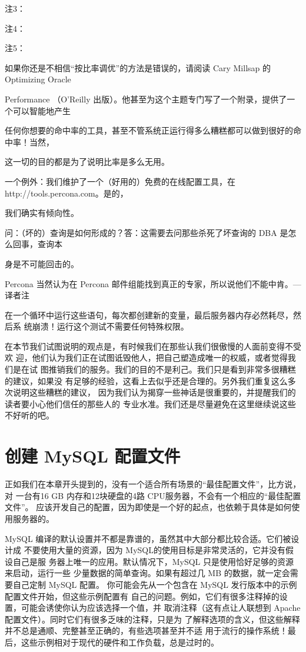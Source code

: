 注3：

注4：

注5：

如果你还是不相信“按比率调优”的方法是错误的，请阅读 Cary Millsap 的 Optimizing Oracle

Performance （O'Reilly 出版）。他甚至为这个主题专门写了一个附录，提供了一个可以智能地产生

任何你想要的命中率的工具，甚至不管系统正运行得多么糟糕都可以做到很好的命中率！当然，

这一切的目的都是为了说明比率是多么无用。

一个例外：我们维护了一个（好用的）免费的在线配置工具，在 http://tools.percona.com。是的，

我们确实有倾向性。

问：（坏的）查询是如何形成的？答：这需要去问那些杀死了坏查询的 DBA 是怎么回事，查询本

身是不可能回击的。

Percona 当然认为在 Percona 邮件组能找到真正的专家，所以说他们不能中肯。—译者注

在一个循环中运行这些语句，每次都创建新的变量，最后服务器内存必然耗尽，然后系
统崩溃！运行这个测试不需要任何特殊权限。

在本节我们试图说明的观点是，有时候我们在那些认我们很傲慢的人面前变得不受欢
迎，他们认为我们正在试图诋毁他人，把自己塑造成唯一的权威，或者觉得我们是在试
图推销我们的服务。我们的目的不是利己。我们只是看到非常多很糟糕的建议，如果没
有足够的经验，这看上去似乎还是合理的。另外我们重复这么多次说明这些糟糕的建议，
因为我们认为揭穿一些神话是很重要的，并提醒我们的读者要小心他们信任的那些人的
专业水准。我们还是尽量避免在这里继续说这些不好听的吧。

\section{创建 MySQL 配置文件}
正如我们在本章开头提到的，没有一个适合所有场景的“最佳配置文件”，比方说，对
一台有16 GB 内存和12块硬盘的4路 CPU服务器，不会有一个相应的“最佳配置文件”。
应该开发自己的配置，因为即使是一个好的起点，也依赖于具体是如何使用服务器的。

MySQL 编译的默认设置并不都是靠谱的，虽然其中大部分都比较合适。它们被设计成
不要使用大量的资源，因为 MySQL的使用目标是非常灵活的，它并没有假设自己是服
务器上唯一的应用。默认情况下，MySQL 只是使用恰好足够的资源来启动，运行一些
少量数据的简单查询。如果有超过几 MB 的数据，就一定会需要自己定制 MySQL 配置。
你可能会先从一个包含在 MySQL 发行版本中的示例配置文件开始，但这些示例配置有
自己的问题。例如，它们有很多注释掉的设置，可能会诱使你认为应该选择一个值，并
取消注释（这有点让人联想到 Apache配置文件）。同时它们有很多乏味的注释，只是为
了解释选项的含义，但这些解释并不总是通顺、完整甚至正确的，有些选项甚至并不适
用于流行的操作系统！最后，这些示例相对于现代的硬件和工作负载，总是过时的。

